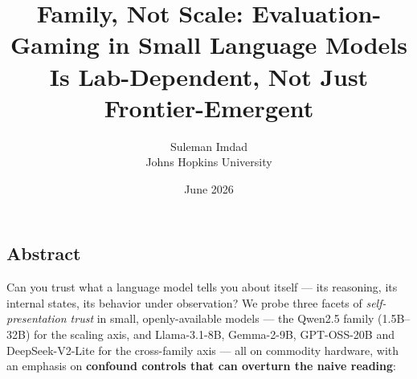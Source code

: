 \documentclass[
]{article}
\title{Family, Not Scale: Evaluation-Gaming in Small Language Models Is
Lab-Dependent, Not Just Frontier-Emergent}
\author{Suleman Imdad \\ \normalsize Johns Hopkins University}
\date{June 2026}
\begin{document}
\maketitle

\subsection{Abstract}\label{abstract}

Can you trust what a language model tells you about itself --- its
reasoning, its internal states, its behavior under observation? We probe
three facets of \emph{self-presentation trust} in small,
openly-available models --- the Qwen2.5 family (1.5B--32B) for the
scaling axis, and Llama-3.1-8B, Gemma-2-9B, GPT-OSS-20B and
DeepSeek-V2-Lite for the cross-family axis --- all on commodity
hardware, with an emphasis on \textbf{confound controls that can
overturn the naive reading}:
\end{document}

